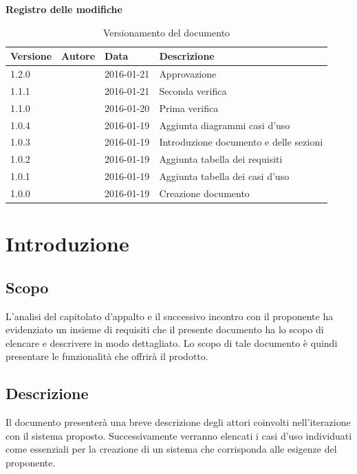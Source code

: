 \documentclass[12pt,a4paper]{article}
\begin{document}
\Large{\textbf{Registro delle modifiche}}\\
\normalsize

\begin{table}[H]
	\begin{center}
		\begin{tabular}{p{} p{} p{} p{}}
			\toprule
			\textbf{Versione}	&	\textbf{Autore}	&	\textbf{Data}	&	\textbf{Descrizione}\\
			\midrule
			\midrule
			1.2.0 & \NDC{} & 2016-01-21 &  Approvazione \\
			\midrule
			1.1.1 & \IB{} & 2016-01-21 &  Seconda verifica \\
			\midrule
			1.1.0 & \AVI{} & 2016-01-20 &  Prima verifica \\
			\midrule
            1.0.4 & \TP{} & 2016-01-19 & Aggiunta diagrammi casi d'uso\\
            \midrule
			1.0.3 & \AVE{} & 2016-01-19 &  Introduzione documento e delle sezioni  \\
			\midrule
			1.0.2 & \AB{} & 2016-01-19 &  Aggiunta tabella dei requisiti \\
			\midrule
			1.0.1 & \WS{} & 2016-01-19 &  Aggiunta tabella dei casi d'uso \\
			\midrule
			1.0.0 & \NDC{} & 2016-01-19 &  Creazione documento \\
			\bottomrule
		\end{tabular}
		\caption{Versionamento del documento}
		\label{tabVers1}
	\end{center}
\end{table}
\newpage

\tableofcontents
\listoftables
\newpage

\section{Introduzione}

\subsection{Scopo}
L’analisi del capitolato d’appalto e il successivo incontro con il proponente ha evidenziato un insieme di requisiti che il presente documento ha lo scopo di elencare e descrivere in modo dettagliato. Lo scopo di tale documento è quindi presentare le funzionalità che offrirà il prodotto.

\subsection{Descrizione}
Il documento presenterà una breve descrizione degli attori coinvolti nell'iterazione con il sistema proposto. Successivamente verranno elencati i casi d'uso individuati come essenziali per la creazione di un sistema che corrisponda alle esigenze del proponente.
\end{document}
